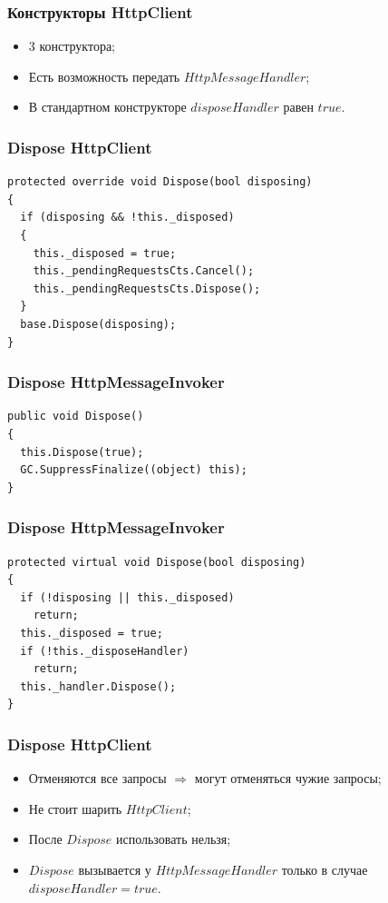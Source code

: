 \documentclass[17pt,aspectratio=169]{beamer}
\begin{document}
\begin{frame}
\frametitle{Конструкторы HttpClient}
\begin{itemize}
	\item <1-> 3 конструктора;
	\item <2-> Есть возможность передать $HttpMessageHandler$;
	\item <3-> В стандартном конструкторе $disposeHandler$ равен $true$.
\end{itemize}
\end{frame}

\begin{frame}[fragile]
\frametitle{Dispose HttpClient}
\begin{lstlisting}
protected override void Dispose(bool disposing)
{
  if (disposing && !this._disposed)
  {
    this._disposed = true;
    this._pendingRequestsCts.Cancel();
    this._pendingRequestsCts.Dispose();
  }
  base.Dispose(disposing);
}
\end{lstlisting}
\end{frame}

\begin{frame}[fragile]
\frametitle{Dispose HttpMessageInvoker}
\begin{lstlisting}
public void Dispose()
{
  this.Dispose(true);
  GC.SuppressFinalize((object) this);
}
\end{lstlisting}
\end{frame}

\begin{frame}[fragile]
\frametitle{Dispose HttpMessageInvoker}
\begin{lstlisting}
protected virtual void Dispose(bool disposing)
{
  if (!disposing || this._disposed)
    return;
  this._disposed = true;
  if (!this._disposeHandler)
    return;
  this._handler.Dispose();
}
\end{lstlisting}
\end{frame}

\begin{frame}
\frametitle{Dispose HttpClient}
\begin{itemize}
	\item <1-> Отменяются все запросы $\Rightarrow$ могут отменяться чужие запросы;
	\item <2-> Не стоит шарить $HttpClient$;
	\item <3-> После $Dispose$ использовать нельзя;
	\item <4-> $Dispose$ вызывается у $HttpMessageHandler$ только в случае $disposeHandler = true$.
\end{itemize}
\end{frame}
\end{document}
